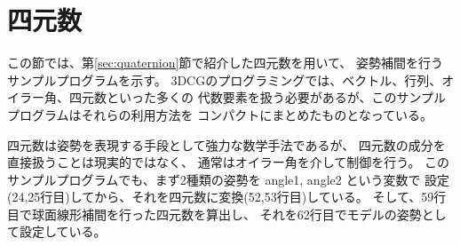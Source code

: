 \section{四元数}
この節では、第\ref{sec:quaternion}節で紹介した四元数を用いて、
姿勢補間を行うサンプルプログラムを示す。
3DCGのプログラミングでは、ベクトル、行列、オイラー角、四元数といった多くの
代数要素を扱う必要があるが、このサンプルプログラムはそれらの利用方法を
コンパクトにまとめたものとなっている。

四元数は姿勢を表現する手段として強力な数学手法であるが、
四元数の成分を直接扱うことは現実的ではなく、
通常はオイラー角を介して制御を行う。
このサンプルプログラムでも、まず2種類の姿勢を angle1, angle2 という変数で
設定(24,25行目)してから、それを四元数に変換(52,53行目)している。
そして、59行目で球面線形補間を行った四元数を算出し、
それを62行目でモデルの姿勢として設定している。\\ ~

